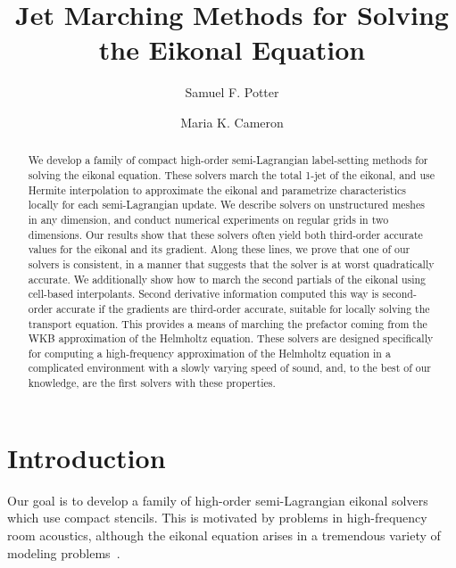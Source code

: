 \documentclass{siamart190516}
\title{Jet Marching Methods for Solving the Eikonal Equation}
\author{Samuel F. Potter \and Maria K. Cameron}
\begin{document}
\maketitle

\begin{abstract}
  We develop a family of compact high-order semi-Lagrangian
  label-setting methods for solving the eikonal equation. These
  solvers march the total 1-jet of the eikonal, and use Hermite
  interpolation to approximate the eikonal and parametrize
  characteristics locally for each semi-Lagrangian update. We describe
  solvers on unstructured meshes in any dimension, and conduct
  numerical experiments on regular grids in two dimensions. Our
  results show that these solvers often yield both third-order
  accurate values for the eikonal and its gradient. Along these lines,
  we prove that one of our solvers is consistent, in a manner that
  suggests that the solver is at worst quadratically accurate. We
  additionally show how to march the second partials of the eikonal
  using cell-based interpolants. Second derivative information
  computed this way is second-order accurate if the gradients are
  third-order accurate, suitable for locally solving the transport
  equation. This provides a means of marching the prefactor coming
  from the WKB approximation of the Helmholtz equation. These solvers
  are designed specifically for computing a high-frequency
  approximation of the Helmholtz equation in a complicated environment
  with a slowly varying speed of sound, and, to the best of our
  knowledge, are the first solvers with these properties.
\end{abstract}

\section{Introduction}

Our goal is to develop a family of high-order semi-Lagrangian eikonal
solvers which use compact stencils. This is motivated by problems in
high-frequency room acoustics, although the eikonal equation arises in
a tremendous variety of modeling problems~\cite{Sethian:1999ab}.
\end{document}

